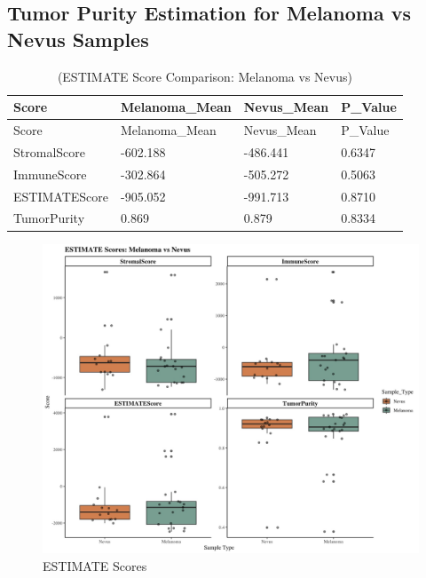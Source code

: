 \documentclass[
]{article}
\begin{document}
\newpage

\subsection{Tumor Purity Estimation for Melanoma vs Nevus
Samples}\label{tumor-purity-estimation-for-melanoma-vs-nevus-samples}

\begin{longtable}[]{@{}llll@{}}
\caption{(ESTIMATE Score Comparison: Melanoma vs Nevus)}\tabularnewline
\toprule\noalign{}
Score & Melanoma\_Mean & Nevus\_Mean & P\_Value \\
\midrule\noalign{}
\endfirsthead
\toprule\noalign{}
Score & Melanoma\_Mean & Nevus\_Mean & P\_Value \\
\midrule\noalign{}
\endhead
\bottomrule\noalign{}
\endlastfoot
StromalScore & -602.188 & -486.441 & 0.6347 \\
ImmuneScore & -302.864 & -505.272 & 0.5063 \\
ESTIMATEScore & -905.052 & -991.713 & 0.8710 \\
TumorPurity & 0.869 & 0.879 & 0.8334 \\
\end{longtable}

\begin{figure}

{\centering \includegraphics[width=0.9\linewidth]{Images/ESTIMATE} 

}

\caption{ESTIMATE Scores}\label{fig:unnamed-chunk-34}
\end{figure}

\newpage
\end{document}
